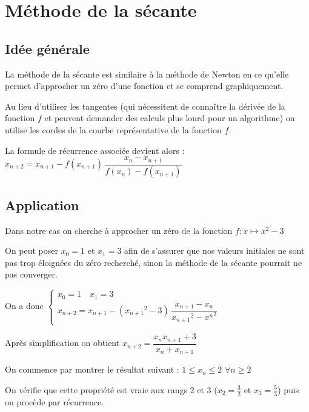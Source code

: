 \documentclass[oneside,12pt]{article}          %
\begin{document}
\newpage



\section{Méthode de la sécante}

\subsection{Idée générale}
La méthode de la sécante est similaire à la méthode de Newton en ce qu'elle permet d'approcher un zéro d'une fonction et se comprend graphiquement.

Au lieu d'utiliser les tangentes (qui nécessitent de connaître la dérivée de la fonction $f$ et peuvent demander des calculs plus lourd pour un algorithme) on utilise les cordes de la courbe représentative de la fonction $f$.

La formule de récurrence associée devient alors : $x_{n+2} = x_{n+1} - f(x_{n+1}) \, \dfrac{x_n - x_{n+1}}{f(x_n) - f(x_{n+1})}$



\subsection{Application}
Dans  notre cas on cherche à approcher un zéro de la fonction $f:x\mapsto x^2 - 3$

On peut poser $x_0 = 1$ et $x_1 = 3$ afin de s'assurer que nos valeurs initiales ne sont pas trop éloignées du zéro recherché, sinon la méthode de la sécante pourrait ne pas converger.

On a donc $\begin{cases}x_0 = 1 \quad x_1 = 3 \\ x_{n+2} = x_{n+1} - ({x_{n+1}}^2-3) \, \dfrac{x_{n+1} - x_n}{{x_{n+1}}^2 - {x^n}^2} \end{cases}$

Après simplification on obtient $x_{n+2} = \dfrac{x_n x_{n+1} +3}{x_n + x_{n+1}}$

On commence par montrer le résultat suivant : $\boxed {1 \leq x_n \leq 2}$ \quad $\forall n \geq 2$

On vérifie que cette propriété est vraie aux rangs $2$ et $3$ ($x_2 = \frac{3}{2}$ et $x_3 = \frac{5}{3}$) puis on procède par récurrence.
\end{document}
